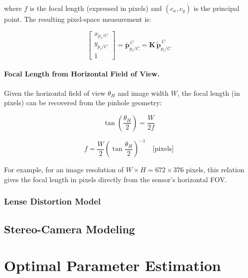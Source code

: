 \documentclass{article}
\newcommand{\vect}[1]{\mathbf{#1}}
\newcommand{\mat}[1]{\mathbf{#1}}
\newcommand{\Kmat}{\mat{K}} %
\begin{document}
where $f$ is the focal length (expressed in pixels) and $(c_x, c_y)$ is the principal point. The resulting pixel-space measurement is:

\begin{equation}
    \begin{bmatrix}
        x_{p_i/C} \\
        y_{p_i/C} \\
        1
    \end{bmatrix}
    = \bar{\vect{p}}^{\,C}_{p_i/C}
    = \Kmat \, \tilde{\vect{p}}^{\,C}_{p_i/C}
    \label{eq:pixel-measurement}
\end{equation}

\paragraph{Focal Length from Horizontal Field of View.}

Given the horizontal field of view $\theta_H$ and image width $W$, the focal length (in pixels) can be recovered from the pinhole geometry:

\begin{equation}
    \tan\left( \frac{\theta_H}{2} \right) = \frac{W}{2f}
\end{equation}

\begin{equation}
    f = \frac{W}{2}\left( \tan \frac{\theta_H}{2} \right)^{-1} \quad \text{[pixels]}
\end{equation}

For example, for an image resolution of $W \times H = 672 \times 376$ pixels, this relation gives the focal length in pixels directly from the sensor's horizontal FOV.

\subsubsection{Lense Distortion Model}
\label{sec:lens-distortion}

\newpage
\subsection{Stereo-Camera Modeling}
\label{sec:stereo-camera-modeling}

\newpage
\section{Optimal Parameter Estimation}
\label{sec:optimal-parameter-estimation}
\end{document}
